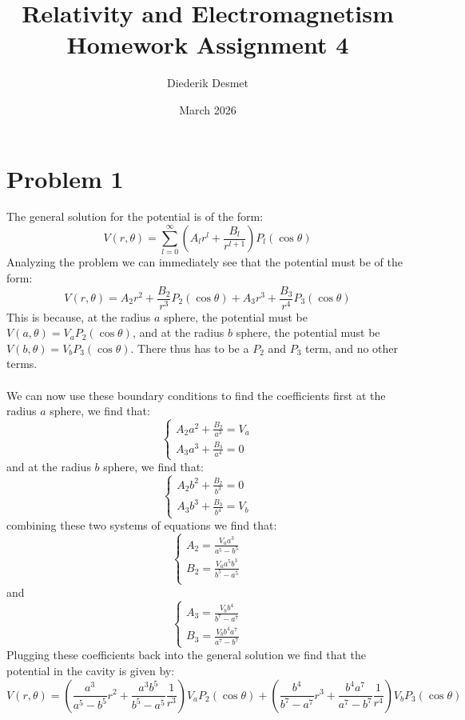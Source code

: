\documentclass[11pt,a4paper]{article}
\title{Relativity and Electromagnetism Homework Assignment 4}
\author{Diederik Desmet}
\date{March 2026}
\begin{document}
\maketitle                  %
\thispagestyle{empty} 
\section*{Problem 1}
The general solution for the potential is of the form:
\[
V(r,\theta)=\sum^{\infty}_{l=0}\left(A_l r^l + \frac{B_l}{r^{l+1}}\right)P_l(\cos\theta)
\]
Analyzing the problem we can immediately see that the potential must be of the form:
\[
V(r, \theta)=A_2 r^2 + \frac{B_2}{r^{3}}P_2(\cos\theta) + A_3 r^3 + \frac{B_3}{r^{4}}P_3(\cos\theta)
\]
This is because, at the radius $a$ sphere, the potential must be $V(a, \theta)=V_aP_2(\cos\theta)$, and at the radius $b$ sphere, the potential must be $V(b, \theta)=V_bP_3(\cos\theta)$. There thus has to be a $P_2$ and $P_3$ term, and no other terms.\\
\\
We can now use these boundary conditions to find the coefficients first at the radius $a$ sphere, we find that:
\[
\begin{cases}
A_2 a^2 + \frac{B_2}{a^{3}}=V_a\\
A_3 a^3 + \frac{B_3}{a^{4}}=0
\end{cases}
\]
and at the radius $b$ sphere, we find that:
\[
\begin{cases}
A_2 b^2 + \frac{B_2}{b^{3}}=0\\
A_3 b^3 + \frac{B_3}{b^{4}}=V_b
\end{cases}
\]
combining these two systems of equations we find that:
\[
\begin{cases}
A_2 = \frac{V_a a^3}{a^5 - b^5}\\
B_2 = \frac{V_a a^5 b^3}{b^5 - a^5}\\
\end{cases}
\]
and
\[\begin{cases}
A_3 = \frac{V_b b^4}{b^7 - a^7}\\
B_3 = \frac{V_b b^4 a^7}{a^7 - b^7}
\end{cases}\]
Plugging these coefficients back into the general solution we find that the potential in the cavity is given by:
\[
V(r,\theta)=\left(\frac{a^3}{a^5 - b^5}r^2+\frac{a^3b^5}{b^5-a^5}\frac{1}{r^3}\right)V_a P_2(\cos\theta)+\left(\frac{b^4}{b^7 - a^7}r^3+\frac{b^4a^7}{a^7 - b^7}\frac{1}{r^4}\right)V_b P_3(\cos\theta)
\] 
\end{document}
